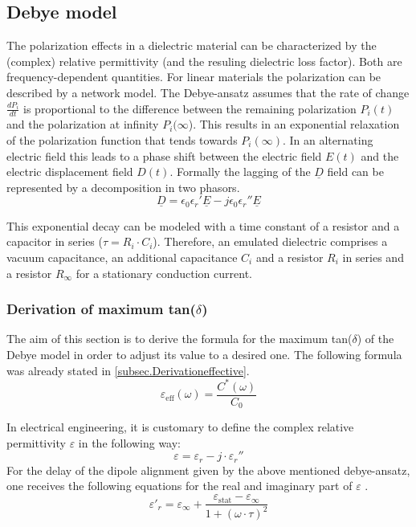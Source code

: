 \subsection{Debye model}
The polarization effects in a dielectric material can be characterized by the (complex) relative permittivity (and the resuling dielectric loss factor). Both are frequency-dependent quantities. 
For linear materials the polarization can be described by a network model. The Debye-ansatz assumes that the rate of change $ \frac{dP_i}{dt}$ is proportional to the difference between the remaining polarization $P_i(t)$  and the polarization at infinity $P_i(\infty$). This results in an exponential relaxation of the polarization function that tends towards $P_i(\infty)$. In an alternating electric field this leads to a phase shift between the electric field $E(t)$  and the  
electric displacement field $D(t)$.\newline
Formally the lagging of the $\underline{D}$ field can be represented by a decomposition in two phasors.
\begin{equation}
 \underline{D}=\epsilon_{0}\epsilon_{r}'\underline{E}-j\epsilon_{0}\epsilon_{r}''\underline{E}
\end{equation}


This exponential decay can be modeled with a  time constant of a resistor and a capacitor in series ($\tau=R_i \cdot C_i$). Therefore, an emulated dielectric comprises a vacuum capacitance, an additional capacitance $C_i$ and a resistor $R_i$ in series and a resistor $R_{\infty}$ for a stationary conduction current. 


\subsubsection{Derivation of maximum tan($\delta$)}
The aim of this section is to derive the formula for the maximum tan($\delta$) of the Debye model in order to adjust its value to a desired one. The following formula was already stated in \ref{subsec.Derivationeffective}.
\begin{equation}
\varepsilon_{\textrm{eff}} (\omega) = \frac{C^*(\omega)}{C_0}
\end{equation}



In electrical engineering,  it is customary to define the  complex relative permittivity $\varepsilon$ in the following way: 
\begin{equation}
\varepsilon  = \varepsilon_r-j \cdot \varepsilon_r''
\end{equation}
For the delay of the dipole alignment given by the above  mentioned debye-ansatz, one receives the following equations for the real and imaginary part of $\varepsilon$ \cite{Kuchler}. 
\begin{equation}
\varepsilon'_r = \varepsilon_{\infty} + \frac{\varepsilon_{\textrm{stat}}-\varepsilon_{\infty}}{1+(\omega \cdot \tau )^2}
\end{equation}


